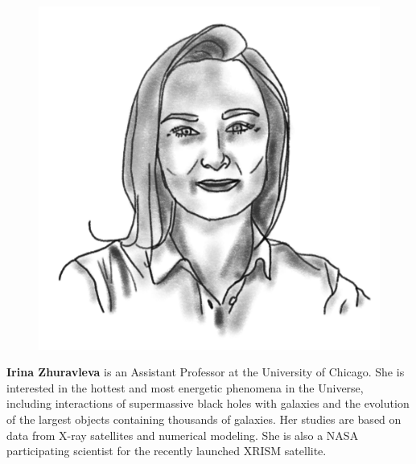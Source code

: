 \begin{figure}
\vspace{-5pt}
\includegraphics[width=0.9\linewidth]{portraits/irina.png}
\end{figure}
\textbf{Irina Zhuravleva} is an Assistant Professor at the University of Chicago. She is interested in the hottest and most energetic phenomena in the Universe, including interactions of supermassive black holes with galaxies and the evolution of the largest objects containing thousands of galaxies. Her studies are based on data from X-ray satellites and numerical modeling. She is also a NASA participating scientist for the recently launched XRISM satellite.
